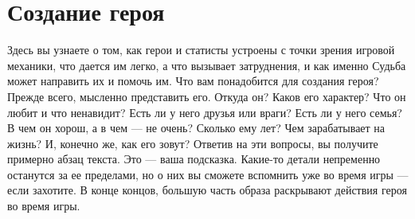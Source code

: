 \chapter{Создание героя}
Здесь вы узнаете о том, как герои и статисты устроены с точки зрения игровой механики, что дается им легко, а что вызывает затруднения, и как именно Судьба может направить их и помочь им. Что вам понадобится для создания героя? Прежде всего, мысленно представить его. Откуда он? Каков его характер? Что он любит и что ненавидит? Есть ли у него друзья или враги? Есть ли у него семья? В чем он хорош, а в чем — не очень? Сколько ему лет? Чем зарабатывает на жизнь? И, конечно же, как его зовут? 
\newline
Ответив на эти вопросы, вы получите примерно абзац текста. Это — ваша подсказка. Какие-то детали непременно останутся за ее пределами, но о них вы сможете вспомнить уже во время игры — если захотите. В конце концов, большую часть образа раскрывают действия героя во время игры.



%














